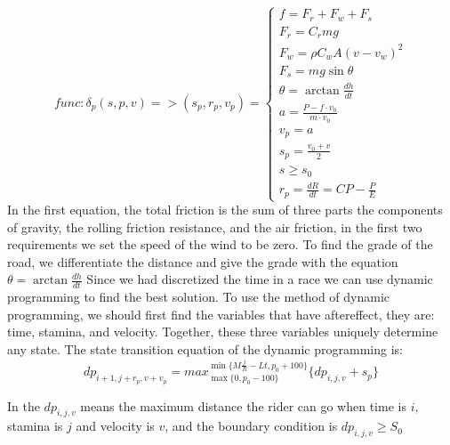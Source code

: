 \documentclass[12pt]{article}
\begin{document}
\begin{equation}
    func: \delta_p(s,p,v)=>(  s_p, r_p, v_p)=\left\{
    \begin{array}{c}
        f=F_r+F_w+F_s                     \\%
        F_r=C_rmg                         \\%
        F_w=\rho C_w A(v-v_w)^2           \\%
        F_s=mg\sin \theta                 \\
        \theta=\arctan\frac{d h}{d t}     \\%
        a=\frac{P-f\cdot v_0}{m\cdot v_0} \\
        v_p=a                             \\
        s_p=\frac{v_0+v}{2}               \\
        s\geqslant s_0                    \\
        r_p=\frac{d R}{d t} =CP-\frac{P}{E}
    \end{array}
    \right.
\end{equation}
In the first equation, the total friction is the sum of three parts the components of gravity, the rolling friction resistance, and the air friction,
in the first two requirements we set the speed of the wind to be zero. To find the grade of the road, we differentiate the distance and give the grade with the equation
$\theta=\arctan\frac{d h}{d t}$
Since we had discretized the time in a race we can use dynamic programming to find the best solution.
To use the method of dynamic programming, we should first find the variables that have aftereffect, they are:  time, stamina, and velocity. Together, these three variables
uniquely determine any state.
The state transition equation of the dynamic programming is:\begin{equation}dp_{i+1,j+r_p,v+v_p}= max_{\max\{0,p_0-100\}}^{\min\{M\frac{j}{R}-Lt,p_0+100\}}\{dp_{i,j,v}+s_p\}\end{equation}

In the $dp_{i,j,v}$ means the maximum distance the rider can go when time is $i$, stamina is $j$ and velocity is $v$, and the boundary condition is $dp_{i,j,v}\geqslant S_0$
\end{document}
